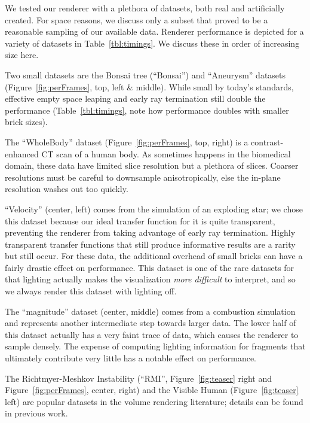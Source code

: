 We tested our renderer with a plethora of datasets, both real and
artificially created.  For space reasons, we discuss only a subset that
proved to be a reasonable sampling of our available data.
Renderer performance is depicted for a variety of datasets in
Table~\ref{tbl:timings}.  We discuss these in order of increasing size
here.

Two small datasets are the Bonsai tree (``Bonsai'') and ``Aneurysm''
datasets (Figure~\ref{fig:perFrames}, top, left \& middle). While
small by today's standards, effective empty space leaping and early ray
termination still double the performance
(Table~\ref{tbl:timings}, note how performance doubles with smaller
brick sizes).

The ``WholeBody'' dataset (Figure~\ref{fig:perFrames}, top, right) is
a contrast-enhanced CT scan of a human body.  As sometimes happens in
the biomedical domain, these data have limited slice resolution but a
plethora of slices.  Coarser resolutions must be careful to downsample
anisotropically, else the in-plane resolution washes out too quickly.

``Velocity'' (center, left) comes from the simulation of an exploding
star; we chose this dataset because our ideal transfer function for it
is quite transparent, preventing the renderer from taking advantage of
early ray termination.  Highly transparent transfer functions that
still produce informative results are a rarity but still occur.  For
these data, the additional overhead of small bricks can have a fairly
drastic effect on performance.  This dataset is one of the rare datasets
for that lighting actually makes the visualization \emph{more
difficult} to interpret, and so we always render this dataset with
lighting off.

The ``magnitude'' dataset (center, middle) comes from a combustion
simulation and represents another intermediate step towards larger
data.  The lower half of this dataset actually has a very faint trace
of data, which causes the renderer to sample densely.  The expense
of computing lighting information for fragments that ultimately
contribute very little has a notable effect on performance.

The Richtmyer-Meshkov Instability (``RMI'',
Figure~\ref{fig:teaser} right and Figure~\ref{fig:perFrames}, center,
right) and the Visible Human (Figure~\ref{fig:teaser} left) are popular
datasets in the volume rendering literature; details can be found in
previous work.

